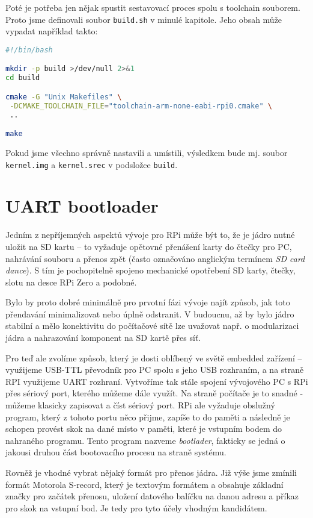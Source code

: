 \documentclass{article}
\begin{document}
Poté je potřeba jen nějak spustit sestavovací proces spolu s toolchain souborem. Proto jsme definovali soubor \texttt{build.sh} v minulé kapitole. Jeho obsah může vypadat například takto:

\begin{lstlisting}[language=bash]
#!/bin/bash

mkdir -p build >/dev/null 2>&1
cd build

cmake -G "Unix Makefiles" \
 -DCMAKE_TOOLCHAIN_FILE="toolchain-arm-none-eabi-rpi0.cmake" \
 ..

make
\end{lstlisting}

Pokud jsme všechno správně nastavili a umístili, výsledkem bude mj. soubor \texttt{kernel.img} a \texttt{kernel.srec} v podsložce \texttt{build}.

\section{UART bootloader}

Jedním z nepříjemných aspektů vývoje pro RPi může být to, že je jádro nutné uložit na SD kartu -- to vyžaduje opětovné přenášení karty do čtečky pro PC, nahrávání souboru a přenos zpět (často označováno anglickým termínem \emph{SD card dance}). S tím je pochopitelně spojeno mechanické opotřebení SD karty, čtečky, slotu na desce RPi Zero a podobné.

Bylo by proto dobré minimálně pro prvotní fázi vývoje najít způsob, jak toto přendavání minimalizovat nebo úplně odstranit. V budoucnu, až by bylo jádro stabilní a mělo konektivitu do počítačové sítě lze uvažovat např. o modularizaci jádra a nahrazování komponent na SD kartě přes síť.

Pro teď ale zvolíme způsob, který je dosti oblíbený ve světě embedded zařízení -- využijeme USB-TTL převodník pro PC spolu s jeho USB rozhraním, a na straně RPI využijeme UART rozhraní. Vytvoříme tak stále spojení vývojového PC s RPi přes sériový port, kterého můžeme dále využít. Na straně počítače je to snadné - můžeme klasicky zapisovat a číst sériový port. RPi ale vyžaduje obslužný program, který z tohoto portu něco přijme, zapíše to do paměti a následně je schopen provést skok na dané místo v paměti, které je vstupním bodem do nahraného programu. Tento program nazveme \emph{bootlader}, fakticky se jedná o jakousi druhou část bootovacího procesu na straně systému.

Rovněž je vhodné vybrat nějaký formát pro přenos jádra. Již výše jsme zmínili formát Motorola S-record, který je textovým formátem a obsahuje základní značky pro začátek přenosu, uložení datového balíčku na danou adresu a příkaz pro skok na vstupní bod. Je tedy pro tyto účely vhodným kandidátem.
\end{document}
